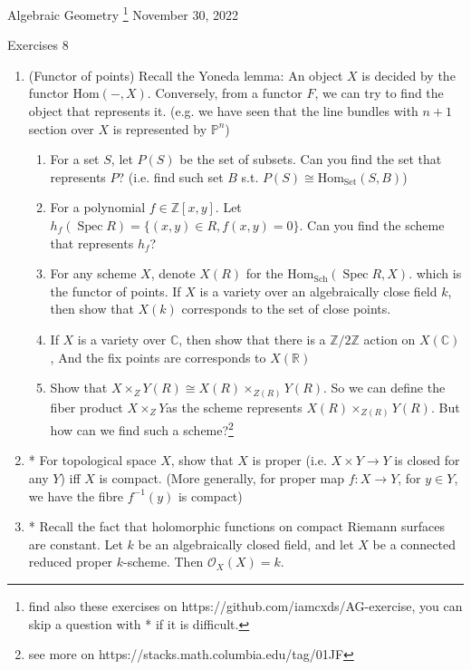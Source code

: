 \documentclass[a4paper,11pt]{article}
\def\bb#1{\mathbb{#1}}
\def\mrm#1{\mathrm{#1}}
\def\Hom{\mathrm{Hom}}
\DeclareMathOperator{\Spec}{Spec}
\begin{document}
{\small Algebraic Geometry
\footnote{find also these exercises on https://github.com/iamcxds/AG-exercise, you can skip a question with * if it is difficult.}
 \hfill November 30, 2022 \\}
\begin{center}
\Huge Exercises 8
\end{center}


\vskip0.6cm


\begin{enumerate}[1.]

\item (Functor of points)
Recall the Yoneda lemma: An object $X$ is decided by the functor $\Hom(-, X)$. Conversely, from a functor $F$, we can try to find the object that represents it. (e.g. we have seen that the line bundles with $n+1$ section over $X$ is represented by $\bb{P}^n$)
\begin{enumerate}
    \item For a set $S$, let $P(S)$ be the set of subsets. Can you find the set that represents $P$? (i.e. find such set $B$ s.t. $P(S)\cong \Hom_{\mrm{Set}}(S,B)$) 
    \item For a polynomial $f\in \bb{Z}[x,y]$. Let $h_f(\Spec R)=\{(x,y)\in R, f(x,y)=0\}$. Can you find the scheme that represents $h_f$?
    \item For any scheme $X$, denote $X(R)$ for the $\Hom_{\mrm{Sch}}(\Spec R, X)$. which is the functor of points. If $X$ is a variety over an algebraically close field $k$, then show that $X(k)$ corresponds to the set of close points.
    \item If $X$ is a variety over $\bb{C}$, then show that there is a $\bb{Z}/2\bb{Z}$ action on $X(\bb{C})$, And the fix points are corresponds to $X(\bb{R})$
    \item Show that $X\times_Z Y(R)\cong X(R)\times_{Z(R)} Y(R)$. So we can define the fiber product $X\times_Z Y$as the scheme represents $  X(R)\times_{Z(R)} Y(R) $. But how can we find such a scheme?\footnote{see more on https://stacks.math.columbia.edu/tag/01JF}
    
\end{enumerate}
\item* For topological space $X$, show that $X$ is proper (i.e. $X\times Y\to Y$ is closed for any $Y$) iff $X$ is compact. (More generally, for proper map $f:X\to Y$, for $y\in Y$, we have the fibre $f^{-1}(y)$ is compact)
\item* Recall the fact that holomorphic functions on compact Riemann surfaces are constant. Let $k$ be an algebraically closed field, and let  $X$ be a connected reduced proper $k$-scheme. Then $\mathcal{O}_X(X)=k$.
\end{enumerate}
\end{document}
